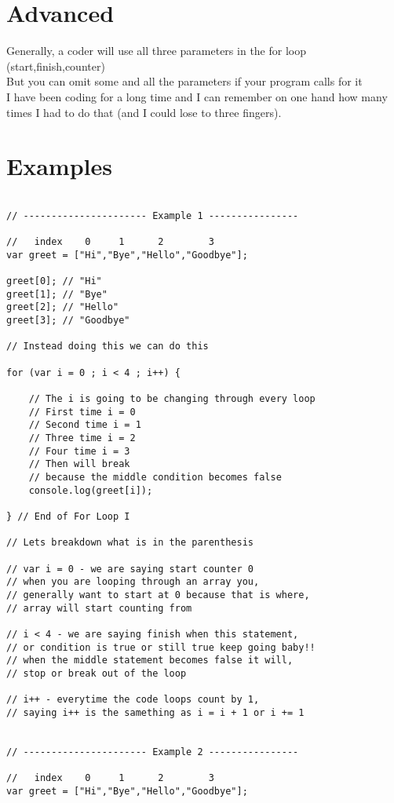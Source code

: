 \documentclass[12pt, letterpaper]{article}
\begin{document}
\section*{Advanced}

Generally, a coder will use all three parameters in the for loop (start,finish,counter)\\
But you can omit some and all the parameters if your program calls for it\\
I have been coding for a long time and I can remember on one hand how many times I had to do that 
(and I could lose to three fingers).

\section*{Examples}

\begin{lstlisting}

// ---------------------- Example 1 ----------------

//   index    0     1      2        3
var greet = ["Hi","Bye","Hello","Goodbye"];

greet[0]; // "Hi"
greet[1]; // "Bye"
greet[2]; // "Hello"
greet[3]; // "Goodbye"

// Instead doing this we can do this

for (var i = 0 ; i < 4 ; i++) {

	// The i is going to be changing through every loop
	// First time i = 0
	// Second time i = 1
	// Three time i = 2
	// Four time i = 3
	// Then will break
	// because the middle condition becomes false 
	console.log(greet[i]);

} // End of For Loop I

// Lets breakdown what is in the parenthesis

// var i = 0 - we are saying start counter 0 
// when you are looping through an array you,
// generally want to start at 0 because that is where,
// array will start counting from

// i < 4 - we are saying finish when this statement,
// or condition is true or still true keep going baby!!
// when the middle statement becomes false it will,
// stop or break out of the loop

// i++ - everytime the code loops count by 1,
// saying i++ is the samething as i = i + 1 or i += 1 


// ---------------------- Example 2 ----------------

//   index    0     1      2        3
var greet = ["Hi","Bye","Hello","Goodbye"];


\end{lstlisting}
\end{document}
